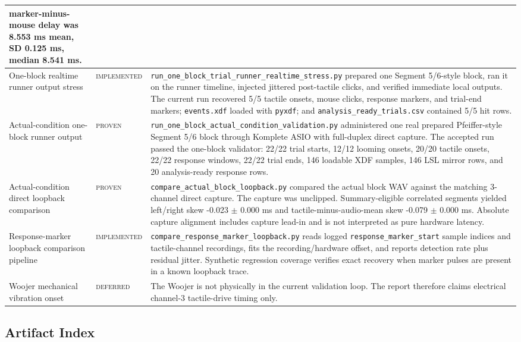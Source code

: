 \documentclass[11pt]{article}
\newcommand{\implemented}{\textsc{implemented}}
\newcommand{\proven}{\textsc{proven}}
\newcommand{\deferred}{\textsc{deferred}}
\begin{document}
\begin{longtable}{|p{}|p{}|p{}|}
marker-minus-mouse delay was 8.553 ms mean, SD 0.125 ms, median 8.541 ms. \\
\hline
One-block realtime runner output stress & \implemented{} &
\texttt{run\_one\_block\_trial\_runner\_realtime\_stress.py} prepared one
Segment 5/6-style block, ran it on the runner timeline, injected jittered
post-tactile clicks, and verified immediate local outputs. The current run
recovered 5/5 tactile onsets, mouse clicks, response markers, and trial-end
markers; \texttt{events.xdf} loaded with \texttt{pyxdf}; and
\texttt{analysis\_ready\_trials.csv} contained 5/5 hit rows. \\
\hline
Actual-condition one-block runner output & \proven{} &
\texttt{run\_one\_block\_actual\_condition\_validation.py} administered one
real prepared Pfeiffer-style Segment 5/6 block through Komplete ASIO with
full-duplex direct capture. The accepted run passed the one-block validator:
22/22 trial starts, 12/12 looming onsets, 20/20 tactile onsets, 22/22 response
windows, 22/22 trial ends, 146 loadable XDF samples, 146 LSL mirror rows, and
20 analysis-ready response rows. \\
\hline
Actual-condition direct loopback comparison & \proven{} &
\texttt{compare\_actual\_block\_loopback.py} compared the actual block WAV
against the matching 3-channel direct capture. The capture was unclipped.
Summary-eligible correlated segments yielded left/right skew -0.023 $\pm$
0.000 ms and tactile-minus-audio-mean skew -0.079 $\pm$ 0.000 ms. Absolute
capture alignment includes capture lead-in and is not interpreted as pure
hardware latency. \\
\hline
Response-marker loopback comparison pipeline & \implemented{} &
\texttt{compare\_response\_marker\_loopback.py} reads logged
\texttt{response\_marker\_start} sample indices and tactile-channel recordings,
fits the recording/hardware offset, and reports detection rate plus residual
jitter. Synthetic regression coverage verifies exact recovery when marker
pulses are present in a known loopback trace. \\
\hline
Woojer mechanical vibration onset & \deferred{} & The Woojer is not physically
in the current validation loop. The report therefore claims electrical
channel-3 tactile-drive timing only. \\
\hline
\end{longtable}

\subsection{Artifact Index}
\end{document}
